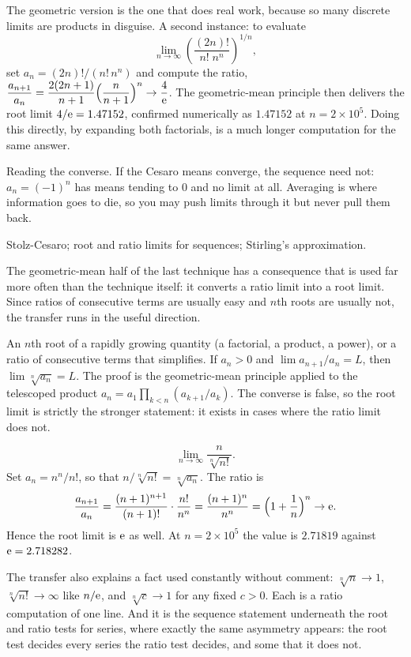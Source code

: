 The geometric version is the one that does real work, because so many discrete limits are products in disguise. A second instance: to evaluate
\[\lim_{n\to\infty}\left(\frac{(2n)!}{n!\;n^{n}}\right)^{1/n},\]
set $a_n=(2n)!/(n!\,n^n)$ and compute the ratio, $\dfrac{a_{n+1}}{a_n}=\dfrac{2(2n+1)}{n+1}\Bigl(\dfrac{n}{n+1}\Bigr)^{n}\to\dfrac{4}{\mathrm{e}}$. The geometric-mean principle then delivers the root limit $4/\mathrm{e}=1.47152$, confirmed numerically as $1.47152$ at $n=2\times10^{5}$. Doing this directly, by expanding both factorials, is a much longer computation for the same answer.

\begin{trap}
Reading the converse. If the Cesaro means converge, the sequence need not: $a_n=(-1)^n$ has means tending to $0$ and no limit at all. Averaging is where information goes to die, so you may push limits through it but never pull them back.
\end{trap}

\begin{seealsob}Stolz-Cesaro; root and ratio limits for sequences; Stirling's approximation.\end{seealsob}

The geometric-mean half of the last technique has a consequence that is used far more often than the technique itself: it converts a ratio limit into a root limit. Since ratios of consecutive terms are usually easy and $n$th roots are usually not, the transfer runs in the useful direction.

\cue An $n$th root of a rapidly growing quantity (a factorial, a product, a power), or a ratio of consecutive terms that simplifies.
\method If $a_n>0$ and $\lim a_{n+1}/a_n=L$, then $\lim\sqrt[n]{a_n}=L$. The proof is the geometric-mean principle applied to the telescoped product $a_n=a_1\prod_{k<n}(a_{k+1}/a_k)$. The converse is false, so the root limit is strictly the stronger statement: it exists in cases where the ratio limit does not.

\begin{worked}
\[\lim_{n\to\infty}\frac{n}{\sqrt[n]{n!}}.\]
Set $a_n=n^n/n!$, so that $n/\sqrt[n]{n!}=\sqrt[n]{a_n}$. The ratio is
\[\frac{a_{n+1}}{a_n}=\frac{(n+1)^{n+1}}{(n+1)!}\cdot\frac{n!}{n^n}=\frac{(n+1)^n}{n^n}=\Bigl(1+\frac1n\Bigr)^{n}\to\mathrm{e}.\]
Hence the root limit is $\mathrm{e}$ as well. At $n=2\times10^5$ the value is $2.71819$ against $\mathrm{e}=2.718282$.
\end{worked}

The transfer also explains a fact used constantly without comment: $\sqrt[n]{n}\to1$, $\sqrt[n]{n!}\to\infty$ like $n/\mathrm{e}$, and $\sqrt[n]{c}\to1$ for any fixed $c>0$. Each is a ratio computation of one line. And it is the sequence statement underneath the root and ratio tests for series, where exactly the same asymmetry appears: the root test decides every series the ratio test decides, and some that it does not.

